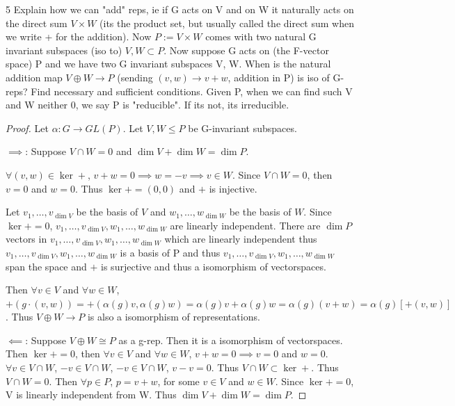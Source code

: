 \documentclass{article}
\begin{document}
\begin{PROB}{5}\label{Problem 5.}
    Explain how we can "add" reps, ie if G acts on V and on W it naturally acts on the direct sum $V \times W$  (its the product set, but usually called the direct sum when we write + for the addition). Now $P := V \times W$ comes with two natural G invariant subspaces (iso to) $V, W \subset P$.  Now suppose G acts on (the F-vector space) P and we have two G invariant subspaces V, W. When is the natural addition map $V \oplus W \to P$ (sending $(v,w) \to v + w$, addition in P) is iso of G-reps? Find necessary and sufficient conditions. Given P, when we can find such V and W neither 0, we say P is "reducible". If its not, its irreducible.
\end{PROB}
\begin{proof}
    Let $\alpha: G \to GL(P)$. Let $V, W \leq P$ be G-invariant subspaces.   
    
    $\implies$: Suppose $V \cap W = 0$ and $\dim V + \dim W = \dim P$. 
    
    $\forall (v, w) \in \ker +$, $v + w = 0 \implies w = -v \implies v \in W$. Since $V \cap W = 0$, then $v = 0$ and $w = 0$. Thus $\ker + = (0,0)$ and $+$ is injective. 
    
    Let $v_1, \dots, v_{\dim V}$ be the basis of $V$ and $w_1, \dots, w_{\dim W}$ be the basis of $W$. Since $\ker + = 0$, $v_1, \dots, v_{\dim V}, w_1, \dots, w_{\dim W}$ are linearly independent. There are $\dim P$ vectors in $v_1, \dots, v_{\dim V}, w_1, \dots, w_{\dim W}$ which are linearly independent thus $v_1, \dots, v_{\dim V}, w_1, \dots, w_{\dim W}$ is a basis of P and thus $v_1, \dots, v_{\dim V}, w_1, \dots, w_{\dim W}$ span the space and $+$ is surjective and thus a isomorphism of vectorspaces.      
    
    Then $\forall v \in V$ and $\forall w \in W$, $+(g \cdot (v,w)) = +(\alpha(g)v, \alpha(g)w) = \alpha(g)v + \alpha(g)w = \alpha(g)(v + w) = \alpha(g)[+(v, w)]$. Thus $V \oplus W \to P$ is also a isomorphism of representations. 
    
    $\impliedby$: Suppose $V \oplus W \cong P$ as a g-rep. Then it is a isomorphism of vectorspaces. Then $\ker + = 0$, then $\forall v \in V$ and $\forall w \in W$, $v + w = 0 \implies v = 0$ and $w = 0$. $\forall v \in V \cap W$, $-v \in V \cap W$, $-v \in V \cap W$, $v - v = 0$. Thus $V \cap W \subset \ker +$. Thus $V \cap W = 0$. Then $\forall p \in P$, $p = v + w$, for some $v \in V$ and $w \in W$. Since $\ker + = 0$, V is linearly independent from W. Thus $\dim V + \dim W = \dim P$.
\end{proof}
\end{document}
